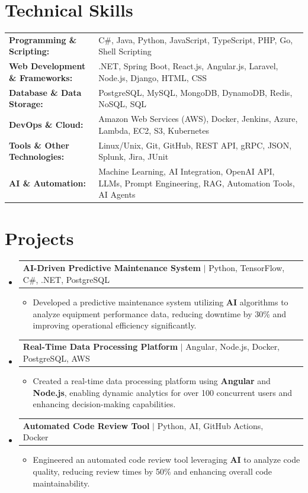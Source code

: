 \documentclass[letterpaper,10pt]{article}
\makeatletter
\newcommand{\resumeItem}[1]{
  \item{\fontsize{8pt}{9pt}\selectfont
    #1 \vspace{-3pt}
  }
}
\newcommand{\resumeProjectHeading}[2]{
    \item
    \begin{tabular*}{1.001\textwidth}{l@{\extracolsep{\fill}}r}
      \fontsize{8.5pt}{10pt}#1 & \textbf{\fontsize{8.5pt}{10pt} #2}\\
    \end{tabular*}\vspace{-7pt}
}
\newcommand{\resumeSubHeadingListStart}{\begin{itemize}[leftmargin=0pt, label={}]}
\newcommand{\resumeSubHeadingListEnd}{\end{itemize}}
\newcommand{\resumeItemListStart}{\begin{itemize}[leftmargin=*]}
\newcommand{\resumeItemListEnd}{\end{itemize}\vspace{-5pt}}
\makeatother
\begin{document}
\section{Technical Skills}
        \vspace{-14pt}
        \begin{table}[h]
            \fontsize{8pt}{9pt}\selectfont
            \begin{tabular}{p{0.3\linewidth} p{0.7\linewidth}}
                \textbf{Programming \& Scripting:} & C\#, Java, Python, JavaScript, TypeScript, PHP, Go, Shell Scripting \\
                \textbf{Web Development \& Frameworks:} & .NET, Spring Boot, React.js, Angular.js, Laravel, Node.js, Django, HTML, CSS \\
                \textbf{Database \& Data Storage:} & PostgreSQL, MySQL, MongoDB, DynamoDB, Redis, NoSQL, SQL \\
                \textbf{DevOps \& Cloud:} & Amazon Web Services (AWS), Docker, Jenkins, Azure, Lambda, EC2, S3, Kubernetes \\
                \textbf{Tools \& Other Technologies:} & Linux/Unix, Git, GitHub, REST API, gRPC, JSON, Splunk, Jira, JUnit \\
                \textbf{AI \& Automation:} & Machine Learning, AI Integration, OpenAI API, LLMs, Prompt Engineering, RAG, Automation Tools, AI Agents \\
            \end{tabular}
        \end{table}
 \vspace{-18pt}

\section{Projects}
    \vspace{-5pt}
    \resumeSubHeadingListStart
          \resumeProjectHeading
            {\textbf{AI-Driven Predictive Maintenance System} $|$ Python, TensorFlow, C\#, .NET, PostgreSQL}{}
            \resumeItemListStart
                \resumeItem{Developed a predictive maintenance system utilizing \textbf{AI} algorithms to analyze equipment performance data, reducing downtime by 30\% and improving operational efficiency significantly.}
            \resumeItemListEnd
        \vspace{-12pt}
    
        \resumeProjectHeading
            {\textbf{Real-Time Data Processing Platform} $|$ Angular, Node.js, Docker, PostgreSQL, AWS}{}
        \resumeItemListStart
                \resumeItem{Created a real-time data processing platform using \textbf{Angular} and \textbf{Node.js}, enabling dynamic analytics for over 100 concurrent users and enhancing decision-making capabilities.}
        \resumeItemListEnd
      \vspace{-12pt}
      \resumeProjectHeading
        {\textbf{Automated Code Review Tool} $|$ Python, AI, GitHub Actions, Docker}{}
    \resumeItemListStart
            \resumeItem{Engineered an automated code review tool leveraging \textbf{AI} to analyze code quality, reducing review times by 50\% and enhancing overall code maintainability.}
    \resumeItemListEnd
    \resumeSubHeadingListEnd
\end{document}
